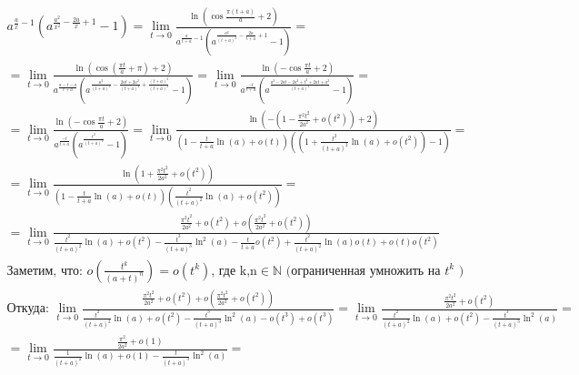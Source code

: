 \begin{enumerate}
\begin{gather*}
{                  {a^{\frac{a}{x}-1}\left(a^{\frac{a^2}{x^2}-\frac{2a}{x}+1}-1\right)}} =
              \lim_{t\rightarrow  0}{\frac
                  {\ln{( \cos{\frac{\pi (t+a)}{a}}+2)}}
                  {a^{\frac{a}{t+a}-1}\left(a^{\frac{a^2}{(t+a)^2}-\frac{2a}{t+a}+1}-1\right)}} = \\
              = \lim_{t\rightarrow  0}{\frac
                  {\ln{( \cos{(\frac{\pi t}{a}+\pi)}+2)}}
                  {a^{\frac{a-t-a}{t+a}}\left(a^{\frac{a^2}{(t+a)^2}-\frac{2at+2a^2}{(t+a)^2}+\frac{(t+a)^2}{(t+a)^2}}-1\right)}} =
              \lim_{t\rightarrow  0}{\frac
                  {\ln{( -\cos{\frac{\pi t}{a}}+2)}}
                  {a^{\frac{-t}{t+a}}\left(a^{\frac{a^2-2at-2a^2+t^2+2at+a^2}{(t+a)^2}}-1\right)}} = \\
              = \lim_{t\rightarrow  0}{\frac
                  {\ln{( -\cos{\frac{\pi t}{a}}+2)}}
                  {a^{\frac{-t}{t+a}}\left(a^{\frac{t^2}{(t+a)^2}}-1\right)}} =
              \lim_{t\rightarrow  0}{\frac
                  {\ln{( -(1-\frac{\pi^2 t^2}{2a^2}+o(t^2))+2)}}
                  {\left(1-\frac{t}{t+a}\ln(a)+o(t)\right)\left((1+\frac{t^2}{(t+a)^2}\ln(a)+o(t^2))-1\right)}} = \\
              = \lim_{t\rightarrow  0}{\frac
                  {\ln{(1+\frac{\pi^2 t^2}{2a^2}+o(t^2))}}
                  {\left(1-\frac{t}{t+a}\ln(a)+o(t)\right)\left(\frac{t^2}{(t+a)^2}\ln(a)+o(t^2)\right)}} =\\
              = \lim_{t\rightarrow  0}{\frac
                  {\frac{\pi^2 t^2}{2a^2}+o(t^2)+o(\frac{\pi^2 t^2}{2a^2}+o(t^2))}
                  {\frac{t^2}{(t+a)^2}\ln(a)+o(t^2)-\frac{t^3}{(t+a)^3}\ln^2(a)-\frac{t}{t+a}o(t^2)+\frac{t^2}{(t+a)^2}\ln(a)o(t)+o(t)o(t^2)}} \\
              \text{Заметим, что: } o\left(\frac{t^k}{(a+t)^n}\right)=o(t^k) \text{, где k,n}  \in \mathbb{N} \text{ (ограниченная умножить на  } t^k \text{ )}\\
              \text{Откуда: }
              \lim_{t\rightarrow  0}{\frac
                  {\frac{\pi^2 t^2}{2a^2}+o(t^2)+o(\frac{\pi^2 t^2}{2a^2}+o(t^2))}
                  {\frac{t^2}{(t+a)^2}\ln(a)+o(t^2)-\frac{t^3}{(t+a)^3}\ln^2(a)-o(t^3)+o(t^3)}} =
              \lim_{t\rightarrow  0}{\frac
                  {\frac{\pi^2 t^2}{2a^2}+o(t^2)}
                  {\frac{t^2}{(t+a)^2}\ln(a)+o(t^2)-\frac{t^3}{(t+a)^3}\ln^2(a)}} = \\
              = \lim_{t\rightarrow  0}{\frac
                  {\frac{\pi^2}{2a^2}+o(1)}
                  {\frac{1}{(t+a)^2}\ln(a)+o(1)-\frac{t}{(t+a)^3}\ln^2(a)}} =

\end{gather*}
\end{enumerate}
